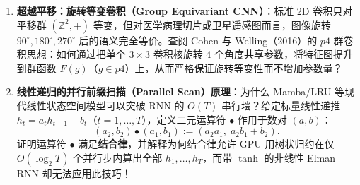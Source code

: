 
\begin{enumerate}
  \item[\textbf{5.3.7}] \textbf{超越平移：旋转等变卷积（Group Equivariant CNN）}：标准 2D 卷积只对平移群 $(\mathbb{Z}^2, +)$ 等变，但对医学病理切片或卫星遥感图而言，图像旋转 $90^\circ, 180^\circ, 270^\circ$ 后的语义完全等价。查阅 Cohen 与 Welling（2016）的 $p4$ 群卷积思想：如何通过把单个 $3\times 3$ 卷积核旋转 $4$ 个角度共享参数，将特征图提升到群函数 $F(g)$（$g \in p4$）上，从而严格保证旋转等变性而不增加参数量？

  \item[\textbf{5.3.8}] \textbf{线性递归的并行前缀扫描（Parallel Scan）原理}：为什么 Mamba/LRU 等现代线性状态空间模型可以突破 RNN 的 $O(T)$ 串行墙？给定标量线性递推 $h_t = a_t h_{t-1} + b_t$（$t = 1, \dots, T$），定义二元运算符 $\bullet$ 作用于数对 $(a, b)$：
  \[
    (a_2, b_2) \bullet (a_1, b_1) := \left(a_2 a_1,\; a_2 b_1 + b_2\right).
  \]
  证明运算符 $\bullet$ 满足\textbf{结合律}，并解释为何结合律允许 GPU 用树状归约在仅 $O(\log_2 T)$ 个并行步内算出全部 $h_1, \dots, h_T$，而带 $\tanh$ 的非线性 Elman RNN 却无法应用此技巧！
\end{enumerate}
